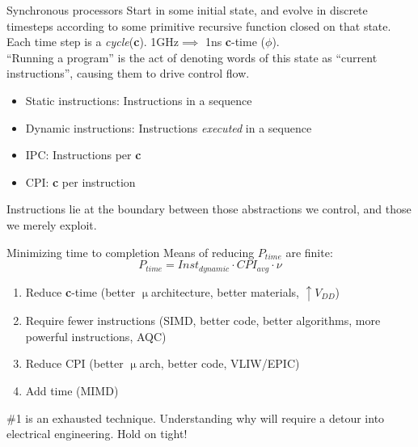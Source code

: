 \documentclass[mathserif,xcolor={dvipsnames,table}]{beamer}
\begin{document}
\begin{frame}{Synchronous processors}
Start in some initial state, and evolve in discrete timesteps
according to some primitive recursive function closed on that state.\\
\vspace{.15in}
Each time step is a \textit{cycle}(\textbf{c}). 1GHz$\implies$ 1ns \textbf{c}-time ($\phi$).\\
\vspace{.15in}
``Running a program'' is the act of denoting words of this state
as ``current instructions'', causing them to drive control flow.
\vspace{.15in}
\begin{itemize}
\item Static instructions: Instructions in a sequence
\item Dynamic instructions: Instructions \textit{executed} in a sequence
\item IPC: Instructions per \textbf{c}
\item CPI: \textbf{c} per instruction
\end{itemize}
\vspace{.15in}
Instructions lie at the boundary between those abstractions we control, and those
we merely exploit.%
\end{frame}

\begin{frame}{Minimizing time to completion}
Means of reducing $P_{time}$ are finite:
\begin{equation}
P_{time} = Inst_{dynamic}\cdot CPI_{avg}\cdot\nu
\end{equation}
\begin{enumerate}
\item Reduce \textbf{c}-time (better $\upmu$architecture, better materials, $\uparrow V_{DD}$)
\item Require fewer instructions (SIMD, better code, better algorithms, more powerful instructions, AQC)
\item Reduce CPI (better $\upmu$arch, better code, VLIW/EPIC)
\item Add time (MIMD)
\end{enumerate}
\vspace{.25in}
\#1 is an exhausted technique. Understanding why will require a detour into
electrical engineering. Hold on tight!
\end{frame}
\end{document}
